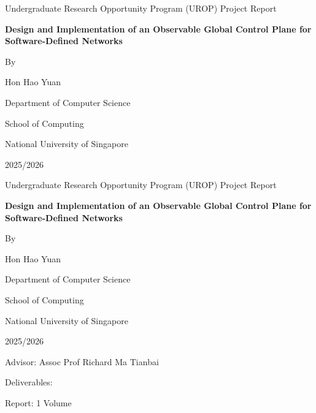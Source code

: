 \documentclass[11pt, a4paper]{article}
\begin{document}
\begin{titlepage}
    \centering
    {\Large Undergraduate Research Opportunity Program
(UROP) Project Report\par}
    \vspace*{\fill}
    {\huge \textbf{Design and Implementation of an Observable Global Control Plane for Software-Defined Networks}\par}
    \vspace*{\fill}
    {\Large By\par}
    \vspace{0.5cm}
    {\Large Hon Hao Yuan\par}
    \vspace*{\fill}
    {\Large Department of Computer Science\par}
    {\Large School of Computing\par}
    {\Large National University of Singapore\par}
    \vspace{0.5cm}
    {\Large 2025/2026\par}
\end{titlepage}

\begin{titlepage}
    \centering
    {\Large Undergraduate Research Opportunity Program
(UROP) Project Report\par}
    \vspace*{\fill}
    {\huge \textbf{Design and Implementation of an Observable Global Control Plane for Software-Defined Networks}\par}
    \vspace*{\fill}
    {\Large By\par}
    \vspace{0.5cm}
    {\Large Hon Hao Yuan\par}
    \vspace*{\fill}
    {\Large Department of Computer Science\par}
    {\Large School of Computing\par}
    {\Large National University of Singapore\par}
    \vspace{0.5cm}
    {\Large 2025/2026\par}
    \vspace{1cm}
    \begin{flushleft}
    \large
    Advisor: Assoc Prof Richard Ma Tianbai\par
    \vspace{0.5cm}
    Deliverables:\par
    \qquad \qquad Report: 1 Volume\par
    \end{flushleft}
\end{titlepage}
\end{document}
